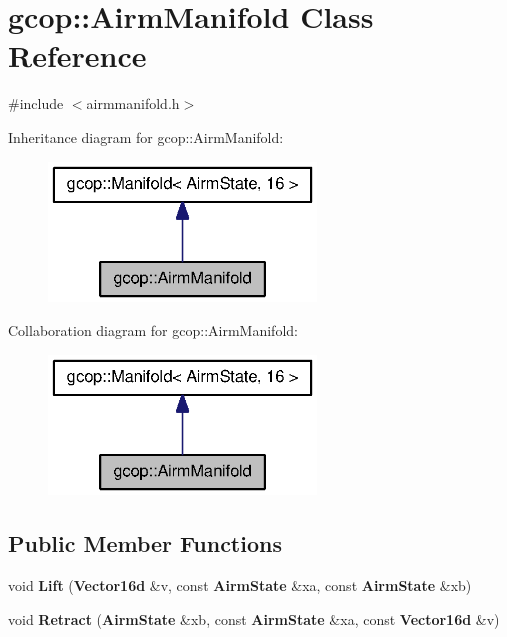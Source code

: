 \section{gcop\-:\-:\-Airm\-Manifold \-Class \-Reference}
\label{classgcop_1_1AirmManifold}


{\ttfamily \#include $<$airmmanifold.\-h$>$}



\-Inheritance diagram for gcop\-:\-:\-Airm\-Manifold\-:
\nopagebreak
\begin{figure}[H]
\begin{center}
\leavevmode
\includegraphics[width=202pt]{classgcop_1_1AirmManifold__inherit__graph}
\end{center}
\end{figure}


\-Collaboration diagram for gcop\-:\-:\-Airm\-Manifold\-:
\nopagebreak
\begin{figure}[H]
\begin{center}
\leavevmode
\includegraphics[width=202pt]{classgcop_1_1AirmManifold__coll__graph}
\end{center}
\end{figure}
\subsection*{\-Public \-Member \-Functions}
\begin{DoxyCompactItemize}
\item 
void {\bf \-Lift} ({\bf \-Vector16d} \&v, const {\bf \-Airm\-State} \&xa, const {\bf \-Airm\-State} \&xb)
\item 
void {\bf \-Retract} ({\bf \-Airm\-State} \&xb, const {\bf \-Airm\-State} \&xa, const {\bf \-Vector16d} \&v)
\end{DoxyCompactItemize}
